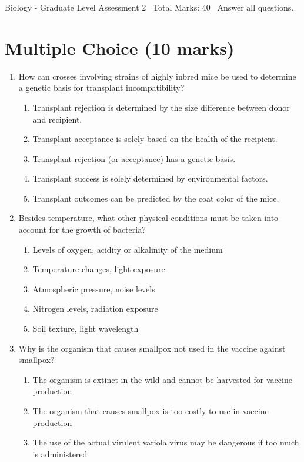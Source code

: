 \documentclass[12pt]{article}
\begin{document}
\begin{center}
Biology - Graduate Level Assessment 2 \
Total Marks: 40 \
Answer all questions.
\end{center}

\section*{Multiple Choice (10 marks)}
\begin{enumerate}[label=\arabic*.]
\item How can crosses involving strains of highly inbred mice be used to determine a genetic
basis for transplant incompatibility?
\begin{enumerate}[label=(\alph*)]
    \item Transplant rejection is determined by the size difference between donor and recipient.
    \item Transplant acceptance is solely based on the health of the recipient.
    \item Transplant rejection (or acceptance) has a genetic basis.
    \item Transplant success is solely determined by environmental factors.
    \item Transplant outcomes can be predicted by the coat color of the mice.
\end{enumerate}
\item Besides temperature, what other physical conditions must be taken into account for the
growth of bacteria?
\begin{enumerate}[label=(\alph*)]
    \item Levels of oxygen, acidity or alkalinity of the medium
    \item Temperature changes, light exposure
    \item Atmospheric pressure, noise levels
    \item Nitrogen levels, radiation exposure
    \item Soil texture, light wavelength
\end{enumerate}
\item Why is the organism that causes smallpox not used in the vaccine against smallpox?
\begin{enumerate}[label=(\alph*)]
    \item The organism is extinct in the wild and cannot be harvested for vaccine production
    \item The organism that causes smallpox is too costly to use in vaccine production
    \item The use of the actual virulent variola virus may be dangerous if too much is administered

\end{enumerate}
\end{enumerate}
\end{document}
